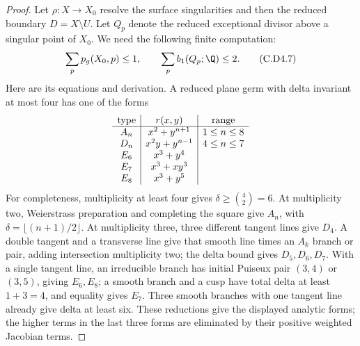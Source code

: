 \begin{proof}
Let $\rho:X\to X_0$ resolve the surface singularities and
then the reduced boundary $D=X\setminus U$. Let $Q_p$ denote
the reduced exceptional divisor above a singular point of
$X_0$. We need the following finite computation:
\[
  \sum_p p_g(X_0,p)\le1,\qquad
  \sum_p b_1(Q_p;\Q)\le2.
\tag{C.D4.7}\label{cdp:eq:C.D4.7}
\]
Here are its equations and derivation. A reduced plane germ
with delta invariant at most four has one of the forms
\[
\begin{array}{c|c|c}
 \hbox{type}&r(x,y)&\hbox{range}\\ \hline
 A_n&x^2+y^{n+1}&1\le n\le8\\
 D_n&x^2y+y^{n-1}&4\le n\le7\\
 E_6&x^3+y^4&\\
 E_7&x^3+xy^3&\\
 E_8&x^3+y^5&
\end{array}
\]
For completeness, multiplicity at least four gives
$\delta\ge\binom42=6$. At multiplicity two, Weierstrass
preparation and completing the square give $A_n$, with
$\delta=\lfloor(n+1)/2\rfloor$. At multiplicity three,
three different tangent lines give $D_4$. A double tangent
and a transverse line give that smooth line times an
$A_k$ branch or pair, adding intersection multiplicity two;
the delta bound gives $D_5,D_6,D_7$. With a single tangent
line, an irreducible branch has initial Puiseux pair $(3,4)$
or $(3,5)$, giving $E_6,E_8$; a smooth branch and a cusp
have total delta at least $1+3=4$, and equality gives $E_7$.
Three smooth branches with one tangent line already give
delta at least six. These reductions give the displayed
analytic forms; the higher terms in the last three forms
are eliminated by their positive weighted Jacobian terms.


\end{proof}
